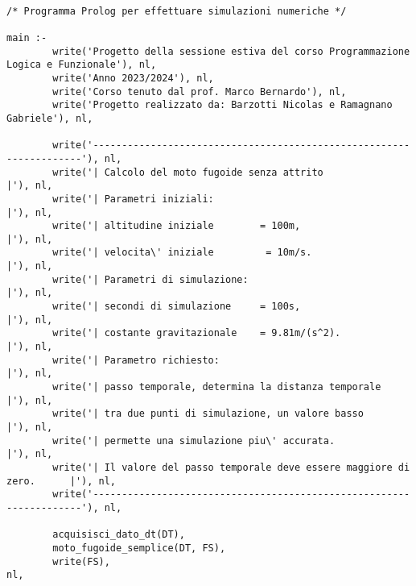 
\scriptsize
\begin{verbatim}
   
/* Programma Prolog per effettuare simulazioni numeriche */

main :- 
        write('Progetto della sessione estiva del corso Programmazione Logica e Funzionale'), nl,
        write('Anno 2023/2024'), nl,
        write('Corso tenuto dal prof. Marco Bernardo'), nl,
        write('Progetto realizzato da: Barzotti Nicolas e Ramagnano Gabriele'), nl, 

        write('--------------------------------------------------------------------'), nl,
        write('| Calcolo del moto fugoide senza attrito                           |'), nl,
        write('| Parametri iniziali:                                              |'), nl,
        write('| altitudine iniziale        = 100m,                               |'), nl,
        write('| velocita\' iniziale         = 10m/s.                              |'), nl,
        write('| Parametri di simulazione:                                        |'), nl,
        write('| secondi di simulazione     = 100s,                               |'), nl,
        write('| costante gravitazionale    = 9.81m/(s^2).                        |'), nl,
        write('| Parametro richiesto:                                             |'), nl,
        write('| passo temporale, determina la distanza temporale                 |'), nl,
        write('| tra due punti di simulazione, un valore basso                    |'), nl,
        write('| permette una simulazione piu\' accurata.                          |'), nl,
        write('| Il valore del passo temporale deve essere maggiore di zero.      |'), nl,
        write('--------------------------------------------------------------------'), nl,

        acquisisci_dato_dt(DT),                                                        
        moto_fugoide_semplice(DT, FS),
        write(FS),                                                                     nl,


\end{verbatim}
